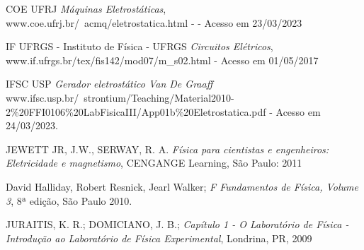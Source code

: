 \begin{thebibliography}{9}

COE UFRJ 
\emph{Máquinas Eletrostáticas}, \\ www.coe.ufrj.br/~acmq/eletrostatica.html -  - Acesso em 23/03/2023

IF UFRGS - Instituto de Física - UFRGS
\emph{Circuitos Elétricos}, \\ www.if.ufrgs.br/tex/fis142/mod07/m\_s02.html - Acesso em 01/05/2017

IFSC USP
\emph{Gerador eletrostático Van De Graaff}
\\ www.ifsc.usp.br/~strontium/Teaching/Material2010-2\%20FFI0106\%20LabFisicaIII/App01b\%20Eletrostatica.pdf - Acesso em 24/03/2023.
 
  JEWETT JR, J.W., SERWAY, R. A. 
  \emph{Física para cientistas e engenheiros: Eletricidade e magnetismo},
  CENGANGE Learning,
  São Paulo:
  2011

David Halliday, Robert Resnick, Jearl Walker; \emph{F Fundamentos de Física, Volume 3}, 8ª edição, São Paulo 2010. 
 
JURAITIS, K. R.; DOMICIANO, J. B.; \emph{Capítulo 1 - O Laboratório de Física - Introdução ao Laboratório de Física Experimental}, Londrina, PR, 2009
  
  
\end{thebibliography}
